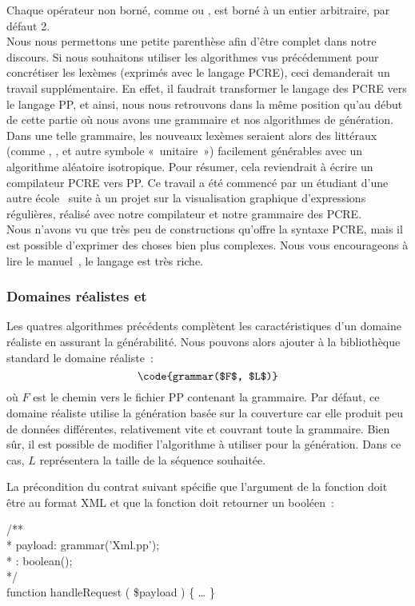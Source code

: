 Chaque opérateur non borné, comme \code{*} ou \code{+}, est borné à un entier
arbitraire, par défaut 2. \\

Nous nous permettons une petite parenthèse afin d'être complet dans notre
discours. Si nous souhaitons utiliser les algorithmes vus précédemment pour
concrétiser les lexèmes (exprimés avec le langage PCRE), ceci demanderait un
travail supplémentaire. En effet, il faudrait transformer le langage des PCRE
vers le langage PP, et ainsi, nous nous retrouvons dans la même position qu'au
début de cette partie où nous avons une grammaire et nos algorithmes de
génération. Dans une telle grammaire, les nouveaux lexèmes seraient alors des
littéraux (comme , ,  et autre symbole «~unitaire~»)
facilement générables avec un algorithme aléatoire isotropique. Pour résumer,
cela reviendrait à écrire un compilateur PCRE vers PP. Ce travail a été commencé
par un étudiant d'une autre école~ suite à un projet sur la
visualisation graphique d'expressions régulières, réalisé avec notre compilateur
et notre grammaire des PCRE. \\

Nous n'avons vu que très peu de constructions qu'offre la syntaxe PCRE, mais il
est possible d'exprimer des choses bien plus complexes. Nous vous encourageons à
lire le manuel~, le langage est très riche.

\subsubsection{Domaines réalistes  et }

Les quatres algorithmes précédents complètent les caractéristiques d'un domaine
réaliste en assurant la générabilité. Nous pouvons alors ajouter à la
bibliothèque standard le domaine réaliste~:
%
$$\code{grammar($F$, $L$)}$$
%
où $F$ est le chemin vers le fichier PP contenant la grammaire. Par défaut, ce
domaine réaliste utilise la génération basée sur la couverture car elle produit
peu de données différentes, relativement vite et couvrant toute la grammaire.
Bien sûr, il est possible de modifier l'algorithme à utiliser pour la
génération. Dans ce cas, $L$ représentera la taille de la séquence souhaitée.

\begin{example}

La précondition du contrat suivant spécifie que l'argument  de
la fonction  doit être au format XML et que la fonction
doit retourner un booléen~:

\begin{pre}
/** \\
 * \arequires payload: grammar('Xml.pp'); \\
 * \aensures  \aresult: boolean(); \\
 */ \\
function handleRequest ( \$payload ) \{ … \}
\end{pre}

\end{example}

